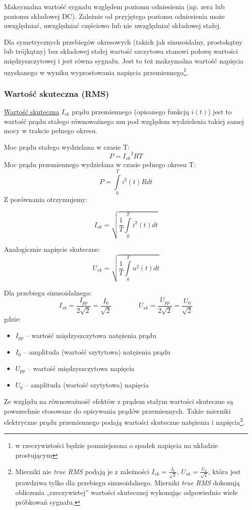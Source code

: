 Maksymalna wartość sygnału względem poziomu odniesienia (np. zera lub poziomu składowej DC).
Zależnie od przyjętego poziomu odniesienia może uwzględniać, uwzględniać częściowo lub nie uwzględniać składowej stałej.

Dla symetrycznych przebiegów okresowych (takich jak sinusoidalny, prostokątny lub trójkątny) bez składowej stałej wartość szczytowa stanowi połowę wartości międzyszczytowej i jest równa \href{https://en.wikipedia.org/wiki/Amplitude}{} sygnału. Jest to też maksymalna wartość napięcia uzyskanego w wyniku wyprostowania napięcia przemiennego\footnote{w rzeczywistości będzie pomniejszona o spadek napięcia na układzie prostującym}.

\subsubsection{Wartość skuteczna (RMS)}

\href{https://pl.wikipedia.org/wiki/Wartość_skuteczna}{Wartość skuteczna} $I_{sk}$ prądu przemiennego (opisanego funkcją $i(t)$) jest to wartość prądu stałego równoważnego mu pod względem wydzielenia takiej samej mocy w trakcie pełnego okresu.

\noindent
Moc prądu stałego wydzielana w czasie T: $$P = {I_{sk}}^2RT$$
Moc prądu przemiennego wydzielana w czasie pełnego okresu T: $$P = \int\limits^{T}_{0}{i^2(t)Rdt}$$
Z porównania otrzymujemy:

$$I_{sk} = \sqrt{\frac{1}{T}\int\limits^{T}_{0}{i^2(t)}dt}$$

\noindent
Analogicznie napięcie skuteczne:
$$U_{sk} = \sqrt{\frac{1}{T}\int\limits^{T}_{0}{u^2(t)}dt}$$

\noindent
Dla przebiegu sinusoidalnego:
	$$I_{sk} = \frac{I_{pp}}{2\sqrt{2}} = \frac{I_{0}}{\sqrt{2}} \qquad\qquad U_{sk} = \frac{U_{pp}}{2\sqrt{2}} = \frac{U_{0}}{\sqrt{2}}$$
gdzie:
\begin{itemize}
	\item $I_{pp}$ – wartość międzyszczytowa natężenia prądu
	\item $I_{0}$  – amplituda (wartość szytytowa) natężenia prądu
	\item $U_{pp}$ – wartość międzyszczytowa napięcia
	\item $U_{0}$  – amplituda (wartość szytytowa) napięcia
\end{itemize}

Ze względu na równoważność efektów z prądem stałym wartości skuteczne są powszechnie stosowane do opisywania prądów przemiennych.
Także mierniki elektryczne prądu przemiennego podają wartości skuteczne natężenia i napięcia\footnote{
	Mierniki nie \textit{true RMS} podają je z zależności $I_{sk} = \frac{I_{0}}{\sqrt{2}}$, $U_{sk} = \frac{U_{0}}{\sqrt{2}}$,
		która jest prawdziwa tylko dla przebiegu sinusoidalnego.
	Mierniki \textit{true RMS} dokonują obliczenia „rzeczywistej” wartości skutecznej wykonując odpowiednio wiele próbkowań sygnału.
}.


